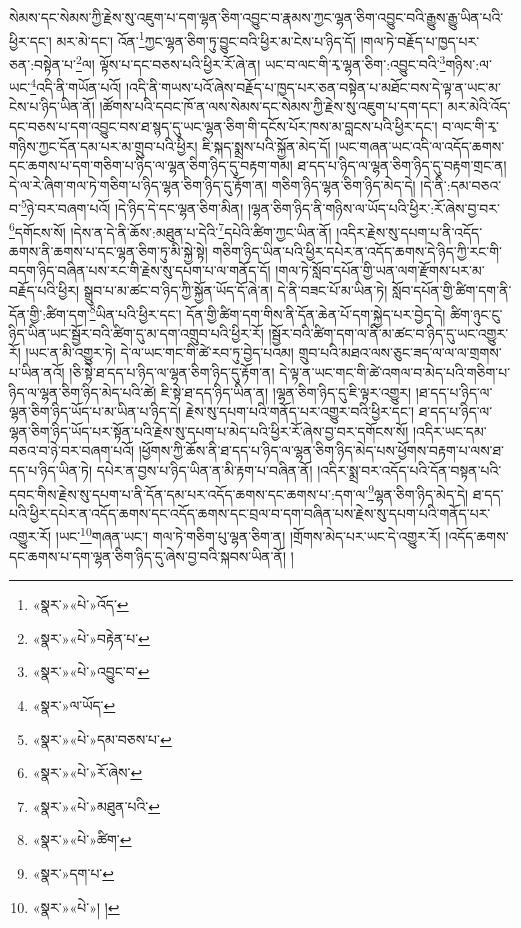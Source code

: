 སེམས་དང་སེམས་ཀྱི་རྗེས་སུ་འཇུག་པ་དག་ལྷན་ཅིག་འབྱུང་བ་རྣམས་ཀྱང་ལྷན་ཅིག་འབྱུང་བའི་རྒྱུས་རྒྱུ་ཡིན་པའི་ཕྱིར་དང་། མར་མེ་དང་། འོན་\footnote{«སྣར་»«པེ་»འོད་}ཀྱང་ལྷན་ཅིག་ཏུ་བྱུང་བའི་ཕྱིར་མ་ངེས་པ་ཉིད་དོ། །གལ་ཏེ་བརྗོད་པ་ཁྱད་པར་ཅན་:བསྟེན་པ་\footnote{«སྣར་»«པེ་»བརྟེན་པ་}ལ། ལྟོས་པ་དང་བཅས་པའི་ཕྱིར་རོ་ཞེ་ན། ཡང་བ་ལང་གི་རྭ་ལྷན་ཅིག་:འབྱུང་བའི་\footnote{«སྣར་»«པེ་»འབྱུང་བ་}གཉིས་:ལ་ཡང་\footnote{«སྣར་»ལ་ཡོད་}འདི་ནི་གཡོན་པའོ། །འདི་ནི་གཡས་པའོ་ཞེས་བརྗོད་པ་ཁྱད་པར་ཅན་བསྟེན་པ་མཐོང་བས་དེ་ལྟ་ན་ཡང་མ་ངེས་པ་ཉིད་ཡིན་ནོ། །ཚོགས་པའི་དབང་ཁོ་ན་ལས་སེམས་དང་སེམས་ཀྱི་རྗེས་སུ་འཇུག་པ་དག་དང་། མར་མེའི་འོད་དང་བཅས་པ་དག་འབྱུང་བས་ཐ་སྙད་དུ་ཡང་ལྷན་ཅིག་གི་དངོས་པོར་ཁས་མ་བླངས་པའི་ཕྱིར་དང་། བ་ལང་གི་རྭ་གཉིས་ཀྱང་དོན་དམ་པར་མ་གྲུབ་པའི་ཕྱིར། ཇི་སྐད་སྨྲས་པའི་སྐྱོན་མེད་དོ། །ཡང་གཞན་ཡང་འདི་ལ་འདོད་ཆགས་དང་ཆགས་པ་དག་གཅིག་པ་ཉིད་ལ་ལྷན་ཅིག་ཉིད་དུ་བརྟག་གམ། ཐ་དད་པ་ཉིད་ལ་ལྷན་ཅིག་ཉིད་དུ་བརྟག་གྲང་ན། དེ་ལ་རེ་ཞིག་གལ་ཏེ་གཅིག་པ་ཉིད་ལྷན་ཅིག་ཉིད་དུ་རྟོག་ན། གཅིག་ཉིད་ལྷན་ཅིག་ཉིད་མེད་དེ། །དེ་ནི་:དམ་བཅའ་བ་\footnote{«སྣར་»«པེ་»དམ་བཅས་པ་}ཉེ་བར་བཞག་པའོ། །དེ་ཉིད་དེ་དང་ལྷན་ཅིག་མིན། །ལྷན་ཅིག་ཉིད་ནི་གཉིས་ལ་ཡོད་པའི་ཕྱིར་:རོ་ཞེས་བྱ་བར་\footnote{«སྣར་»«པེ་»རོ་ཞེས་}དགོངས་སོ། །དེས་ན་དེ་ནི་ཆོས་:མཐུན་པ་དེའི་\footnote{«སྣར་»«པེ་»མཐུན་པའི་}དཔེའི་ཚིག་ཀྱང་ཡིན་ནོ། །འདིར་རྗེས་སུ་དཔག་པ་ནི་འདོད་ཆགས་ནི་ཆགས་པ་དང་ལྷན་ཅིག་ཏུ་མི་སྐྱེ་སྟེ། གཅིག་ཉིད་ཡིན་པའི་ཕྱིར་དཔེར་ན་འདོད་ཆགས་དེ་ཉིད་ཀྱི་རང་གི་བདག་ཉིད་བཞིན་པས་རང་གི་རྗེས་སུ་དཔག་པ་ལ་གནོད་དོ། །གལ་ཏེ་སློབ་དཔོན་གྱི་ཡན་ལག་རྫོགས་པར་མ་བརྗོད་པའི་ཕྱིར། སྒྲུབ་པ་མ་ཚང་བ་ཉིད་ཀྱི་སྐྱོན་ཡོད་དོ་ཞེ་ན། དེ་ནི་བཟང་པོ་མ་ཡིན་ཏེ། སློབ་དཔོན་གྱི་ཚིག་དག་ནི་དོན་གྱི་:ཚིག་དག་\footnote{«སྣར་»«པེ་»ཚིག་}ཡིན་པའི་ཕྱིར་དང་། དོན་གྱི་ཚིག་དག་གིས་ནི་དོན་ཆེན་པོ་དག་སྐྱེད་པར་བྱེད་དེ། ཚིག་ཉུང་ངུ་ཉིད་ཡིན་ཡང་སྦྱོར་བའི་ཚིག་དུ་མ་དག་འགྲུབ་པའི་ཕྱིར་རོ། །སྦྱོར་བའི་ཚིག་དག་ལ་ནི་མ་ཚང་བ་ཉིད་དུ་ཡང་འགྱུར་རོ། །ཡང་ན་མི་འགྱུར་ཏེ། དེ་ལ་ཡང་གང་གི་ཚེ་རབ་ཏུ་བྱེད་པའམ། གྲུབ་པའི་མཐའ་ལས་ཅུང་ཟད་ལ་ལ་ལ་གྲགས་པ་ཡིན་ནའོ། །ཅི་སྟེ་ཐ་དད་པ་ཉིད་ལ་ལྷན་ཅིག་ཉིད་དུ་རྟོག་ན། དེ་ལྟ་ན་ཡང་གང་གི་ཚེ་འགལ་བ་མེད་པའི་གཅིག་པ་ཉིད་ལ་ལྷན་ཅིག་ཉིད་མེད་པའི་ཚེ། ཇི་སྟེ་ཐ་དད་ཉིད་ཡིན་ན། །ལྷན་ཅིག་ཉིད་དུ་ཇི་ལྟར་འགྱུར། །ཐ་དད་པ་ཉིད་ལ་ལྷན་ཅིག་ཉིད་ཡོད་པ་མ་ཡིན་པ་ཉིད་དེ། རྗེས་སུ་དཔག་པའི་གནོད་པར་འགྱུར་བའི་ཕྱིར་དང་། ཐ་དད་པ་ཉིད་ལ་ལྷན་ཅིག་ཉིད་ཡོད་པར་སྟོན་པའི་རྗེས་སུ་དཔག་པ་མེད་པའི་ཕྱིར་རོ་ཞེས་བྱ་བར་དགོངས་སོ། །འདིར་ཡང་དམ་བཅའ་བ་ཉེ་བར་བཞག་པའོ། །ཕྱོགས་ཀྱི་ཆོས་ནི་ཐ་དད་པ་ཉིད་ལ་ལྷན་ཅིག་ཉིད་མེད་པས་ཕྱོགས་བརྟག་པ་ལས་ཐ་དད་པ་ཉིད་ཡིན་ཏེ། དཔེར་ན་བྱས་པ་ཉིད་ཡིན་ན་མི་རྟག་པ་བཞིན་ནོ། །འདིར་སྨྲ་བར་འདོད་པའི་དོན་བསྟན་པའི་དབང་གིས་རྗེས་སུ་དཔག་པ་ནི་དོན་དམ་པར་འདོད་ཆགས་དང་ཆགས་པ་:དག་ལ་\footnote{«སྣར་»དག་པ་}ལྷན་ཅིག་ཉིད་མེད་དེ། ཐ་དད་པའི་ཕྱིར་དཔེར་ན་འདོད་ཆགས་དང་འདོད་ཆགས་དང་བྲལ་བ་དག་བཞིན་པས་རྗེས་སུ་དཔག་པའི་གནོད་པར་འགྱུར་རོ། །ཡང་\footnote{«སྣར་»«པེ་»། །}གཞན་ཡང་། གལ་ཏེ་གཅིག་པུ་ལྷན་ཅིག་ན། །གྲོགས་མེད་པར་ཡང་དེ་འགྱུར་རོ། །འདོད་ཆགས་དང་ཆགས་པ་དག་ལྷན་ཅིག་ཉིད་དུ་ཞེས་བྱ་བའི་སྐབས་ཡིན་ནོ། །
